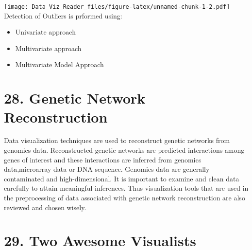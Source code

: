 \documentclass[]{book}
\newenvironment{Shaded}{\begin{snugshade}}{\end{snugshade}}
\newcommand{\KeywordTok}[1]{\textcolor[rgb]{0.13,0.29,0.53}{\textbf{#1}}}
\newcommand{\DataTypeTok}[1]{\textcolor[rgb]{0.13,0.29,0.53}{#1}}
\newcommand{\DecValTok}[1]{\textcolor[rgb]{0.00,0.00,0.81}{#1}}
\newcommand{\CharTok}[1]{\textcolor[rgb]{0.31,0.60,0.02}{#1}}
\newcommand{\StringTok}[1]{\textcolor[rgb]{0.31,0.60,0.02}{#1}}
\newcommand{\CommentTok}[1]{\textcolor[rgb]{0.56,0.35,0.01}{\textit{#1}}}
\newcommand{\OperatorTok}[1]{\textcolor[rgb]{0.81,0.36,0.00}{\textbf{#1}}}
\newcommand{\NormalTok}[1]{#1}
\providecommand{\tightlist}{%
  \setlength{\itemsep}{0pt}\setlength{\parskip}{0pt}}
\theoremstyle{definition}
\theoremstyle{definition}
\theoremstyle{definition}
\theoremstyle{remark}
\begin{document}
\begin{Shaded}
\end{Shaded}

\texttt{[image: Data\_Viz\_Reader\_files/figure-latex/unnamed-chunk-1-2.pdf]}
Detection of Outliers is prformed using:

\begin{itemize}
\tightlist
\item
  Univariate approach
\item
  Multivariate approach
\item
  Multivariate Model Approach
\end{itemize}

\section{28. Genetic Network
Reconstruction}\label{genetic-network-reconstruction}

Data visualization techniques are used to reconstruct genetic networks
from genomics data. Reconstructed genetic networks are predicted
interactions among genes of interest and these interactions are inferred
from genomics data,microarray data or DNA sequence. Genomics data are
generally contaminated and high-dimensional. It is important to examine
and clean data carefully to attain meaningful inferences. Thus
visualization tools that are used in the preprocessing of data
associated with genetic network reconstruction are also reviewed and
chosen wisely.

\section{29. Two Awesome Visualists}\label{two-awesome-visualists}
\end{document}
